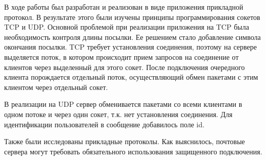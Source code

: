 В ходе работы был разработан и реализован в виде приложения прикладной протокол. В результате этого были изучены принципы программирования сокетов TCP и UDP. Основной проблемой при реализации приложения на TCP была необходимость контроля длины посылки. Ее решением стало добавление символа окончания посылки. TCP требует установления соединения, поэтому на сервере выделяется поток, в котором происходит прием запросов на соединение от клиентов через выделенный для этого сокет. После подключения очередного клиента порождается отдельный поток, осуществляющий обмен пакетами с этим клиентом через отдельный сокет. 

В реализации на UDP сервер обменивается пакетами со всеми клиентами в одном потоке и через один сокет, т.к. нет установления соединения. Для идентификации пользователей в сообщение добавилось поле id.

Также были исследованы прикладные протоколы. Как выяснилось, почтовые сервера могут требовать обязательного использования защищенного подключения.


